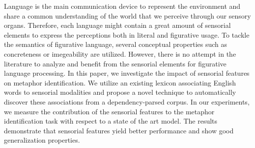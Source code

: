 Language is the main communication device to represent the environment and share a common              understanding of the world that we perceive through our sensory organs. Therefore, each language might contain a great amount of sensorial elements to express the perceptions both in literal and figurative usage. To tackle the semantics of figurative language, several conceptual properties such as concreteness or imegeability are utilized. However, there is no attempt in the literature to analyze and benefit from the sensorial elements for figurative language processing. In this paper, we investigate the impact of sensorial features on metaphor identification. We utilize an existing lexicon associating English words to sensorial modalities and propose a novel technique to automatically discover these associations from a dependency-parsed corpus. In our experiments, we measure the contribution of the sensorial features to the metaphor identification task with respect to a state of the art model. The results demonstrate that sensorial features yield better performance and show good generalization properties.
